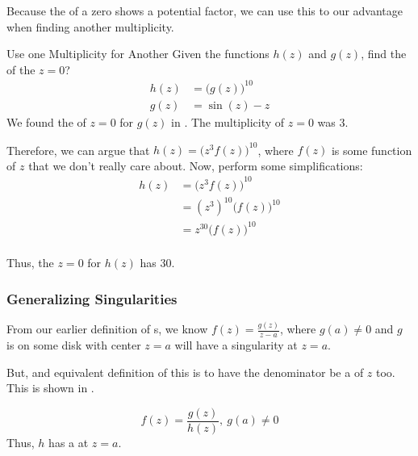Because the  of a zero shows a potential factor, we can use this to our advantage when finding another multiplicity.
\begin{example}{Use one Multiplicity for Another}
  Given the functions $h(z)$ and $g(z)$, find the  of the  $z=0$?
  \begin{align*}
    h(z) &= {\bigl( g(z) \bigr)}^{10} \\
    g(z) &= \sin(z) - z
  \end{align*}
  \tcblower{}
  We found the  of $z=0$ for $g(z)$ in .
  The multiplicity of $z=0$ was $3$.

  Therefore, we can argue that $h(z) = {\bigl( z^{3} f(z) \bigr)}^{10}$, where $f(z)$ is some function of $z$ that we don't really care about.
  Now, perform some simplifications:
  \begin{align*}
    h(z) &= {\bigl( z^{3} f(z) \bigr)}^{10} \\
         &= {(z^{3})}^{10} {\bigl( f(z) \bigr)}^{10} \\
         &= z^{30} {\bigl( f(z) \bigr)}^{10} \\
  \end{align*}

  Thus, the  $z=0$ for $h(z)$ has  $30$.
\end{example}

\subsubsection{Generalizing Singularities}\label{subsubsec:Generalizing_Singularities}
From our earlier definition of s, we know $f(z) = \frac{g(z)}{z-a}$, where $g(a) \neq 0$ and $g$ is  on some disk with center $z=a$ will have a singularity at $z=a$.

But, and equivalent definition of this is to have the denominator be a  of $z$ too.
This is shown in .

\begin{equation}\label{eq:General_Pole}
  f(z) = \frac{g(z)}{h(z)}, \: g(a) \neq 0
\end{equation}
Thus, $h$ has a  at $z=a$.

